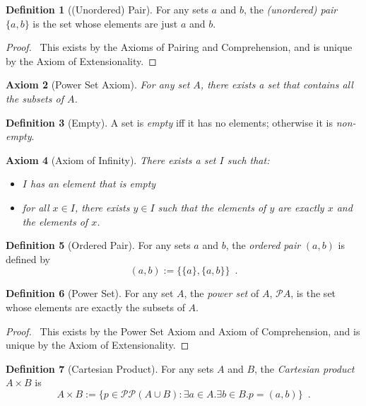 \documentclass{report}
\let\qed\relax
\newtheorem{ax}{Axiom}[chapter]
\theoremstyle{definition}
\newtheorem{df}[ax]{Definition}
\begin{document}
\begin{df}[(Unordered) Pair]
For any sets $a$ and $b$, the \emph{(unordered) pair} $\{a,b\}$ is the set whose elements are just $a$ and $b$.
\end{df}

\begin{proof}
\pf\ This exists by the Axioms of Pairing and Comprehension, and is unique by the Axiom of Extensionality. \qed
\end{proof}

\begin{ax}[Power Set Axiom]
For any set $A$, there exists a set that contains all the subsets of $A$.
\end{ax}

\begin{df}[Empty]
A set is \emph{empty} iff it has no elements; otherwise it is \emph{non-empty}.
\end{df}

\begin{ax}[Axiom of Infinity]
There exists a set $I$ such that:
\begin{itemize}
\item $I$ has an element that is empty
\item for all $x \in I$, there exists $y \in I$ such that the elements of $y$ are exactly $x$ and the elements of $x$.
\end{itemize}
\end{ax}

\begin{df}[Ordered Pair]
For any sets $a$ and $b$, the \emph{ordered pair} $(a,b)$ is defined by
\[ (a,b) := \{ \{ a \}, \{ a, b \} \} \enspace . \]
\end{df}

\begin{df}[Power Set]
For any set $A$, the \emph{power set} of $A$, $\mathcal{P} A$, is the set whose elements are exactly the subsets of $A$.
\end{df}

\begin{proof}
\pf\ This exists by the Power Set Axiom and Axiom of Comprehension, and is unique by the Axiom of Extensionality. \qed
\end{proof}

\begin{df}[Cartesian Product]
For any sets $A$ and $B$, the \emph{Cartesian product} $A \times B$ is
\[ A \times B := \{ p \in \mathcal{P} \mathcal{P} (A \cup B) : \exists a \in A. \exists b \in B. p = (a,b) \} \enspace . \]
\end{df}
\end{document}
